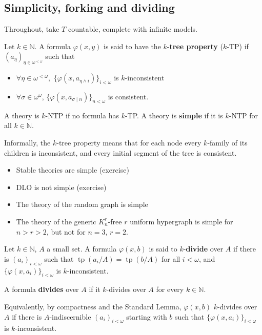 \documentclass{article}
\newcommand{\named}[1]{\textbf{#1}\index{#1}}
\DeclareMathOperator{\tp}{tp}
\begin{document}
\subsection{Simplicity, forking and dividing}
Throughout, take $T$ countable, complete with infinite models.
\begin{defi}
  Let $k \in \mathbb{N}$. A formula $\varphi(x,y)$ is said to have the $k$-\named{tree property} ($k$-TP) if $(a_\eta)_{\eta \in \omega^{<\omega}}$ such that
  \begin{itemize}
    \item $\forall \eta \in \omega^{<\omega},$ $\{\varphi(x,a_{\eta \wedge i})\}_{i < \omega}$
      is $k$-inconsistent
    \item $\forall \sigma \in \omega^\omega$, $\{\varphi(x,a_{\sigma \mid n})\}_{n < \omega}$ is consistent.
  \end{itemize}
  A theory is $k$-NTP if no formula has $k$-TP.
  A theory is \named{simple} if it is $k$-NTP for all $k \in \mathbb{N}$.
\end{defi}
Informally, the $k$-tree property means that for each node every $k$-family of its children is inconsistent, and every initial segment of the tree is consistent.
\begin{eg}\leavevmode
  \begin{itemize}
    \item Stable theories are simple (exercise)
    \item DLO is not simple (exercise)
    \item The theory of the random graph is simple
    \item The theory of the generic $K_n^r$-free $r$ uniform hypergraph is simple for $n > r > 2$, but not for $n = 3$, $r = 2$.
  \end{itemize}
\end{eg}
\begin{defi}
  Let $k \in \mathbb{N}$, $A$ a small set. A formula $\varphi(x,b)$ is said to $k$-\textbf{divide} over $A$ if there is $(a_i)_{i < \omega}$ such that $\tp(a_i / A) = \tp(b/A)$ for all $i < \omega$, and $\{\varphi(x,a_i)\}_{i<\omega}$ is $k$-inconsistent.

  A formula \textbf{divides} over $A$ if it $k$-divides over $A$ for every $k \in \mathbb{N}$.

  Equivalently, by compactness and the Standard Lemma, $\varphi(x,b)$ $k$-divides over $A$ if there is $A$-indiscernible $(a_i)_{i < \omega}$ starting with $b$ such that $\{\varphi(x,a_i)\}_{i < \omega}$ is $k$-inconsistent.
\end{defi}
\end{document}
